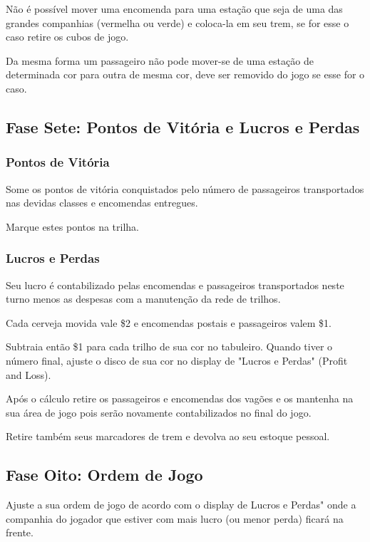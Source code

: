 \documentclass[11pt]{article}
\begin{document}
Não é possível mover uma encomenda para uma estação que seja de uma das grandes companhias (vermelha ou verde) e coloca-la em seu trem, se for esse o caso retire os cubos de jogo.

Da mesma forma um passageiro não pode mover-se de uma estação de determinada cor para outra de mesma cor, deve ser removido do jogo se esse for o caso.

\subsection{Fase Sete: Pontos de Vitória e Lucros e Perdas}
\label{sec:org89ab913}


\subsubsection{Pontos de Vitória}
\label{sec:org14928d7}

Some os pontos de vitória conquistados pelo número de passageiros transportados nas devidas classes e encomendas entregues.

Marque estes pontos na trilha.


\subsubsection{Lucros e Perdas}
\label{sec:org42fe745}

Seu lucro é contabilizado pelas encomendas e passageiros transportados neste turno menos as despesas com a manutenção da rede de trilhos.

Cada cerveja movida vale \$2 e encomendas postais e passageiros valem \$1.

Subtraia então \$1 para cada trilho de sua cor no tabuleiro. Quando tiver o número final, ajuste o disco de sua cor no display de "Lucros e Perdas" (Profit and Loss).

Após o cálculo retire os passageiros e encomendas dos vagões e os mantenha na sua área de jogo pois serão novamente contabilizados no final do jogo.

Retire também seus marcadores de trem e devolva ao seu estoque pessoal.


\subsection{Fase Oito: Ordem de Jogo}
\label{sec:orgafc455c}

Ajuste a sua ordem de jogo de acordo com o display de Lucros e Perdas" onde a companhia do jogador que estiver com mais lucro (ou menor perda) ficará na frente.
\end{document}
